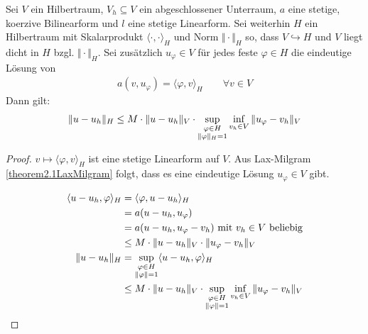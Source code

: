\begin{theorem}\enter
Sei $V$ ein Hilbertraum, $V_h\subseteq V$ ein abgeschlossener Unterraum, $a$ eine stetige, koerzive Bilinearform und $l$ eine stetige Linearform. Sei weiterhin $H$ ein Hilbertraum mit Skalarprodukt $\langle\cdot,\cdot\rangle_H$ und Norm $\Vert\cdot\Vert_H$ so, dass $V\hookrightarrow H$ und $V$ liegt dicht in $H$ bzgl. $\Vert\cdot\Vert_H$. Sei zusätzlich $u_\varphi\in V$ für jedes feste $\varphi\in H$ die eindeutige Lösung von
\begin{align}\label{Dtheorem2.3}\tag{D}
a(v,u_\varphi)=\langle\varphi,v\rangle_H\qquad\forall v\in V
\end{align}
Dann gilt:
\begin{align*}
\Vert u-u_h\Vert_H\leq M\cdot\Vert u-u_h\Vert_V\cdot\sup\limits_{\begin{subarray}{c}\varphi\in H\\\Vert\varphi\Vert_H=1\end{subarray}}\inf\limits_{v_h\in V}\Vert u_\varphi-v_h\Vert_V
\end{align*}
\end{theorem}

\begin{proof}
$v\mapsto\langle\varphi,v\rangle_H$ ist eine stetige Linearform auf $V$. Aus Lax-Milgram \ref{theorem2.1LaxMilgram} folgt, dass es eine eindeutige Lösung $u_\varphi\in V$ gibt.
 
\begin{align*}
\langle u-u_h,\varphi\rangle_H
&=\langle\varphi,u-u_h\rangle_H\\
&=a(u-u_h,u_\varphi)\\
&=a(u-u_h,u_\varphi-v_h)\mit v_h\in V\text{ beliebig}\\
&\leq M\cdot\Vert u-u_h\Vert_V\cdot\Vert u_\varphi-v_h\Vert_V\\
\Vert u-u_h\Vert_H
&=\sup\limits_{\begin{subarray}{c}\varphi\in H\\\Vert\varphi\Vert=1\end{subarray}}\langle u-u_h,\varphi\rangle_H\\
&\leq M\cdot\Vert u-u_h\Vert_V\cdot\sup\limits_{\begin{subarray}{c}\varphi\in H\\\Vert\varphi\Vert=1\end{subarray}}\inf\limits_{v_h\in V}\Vert u_\varphi-v_h\Vert_V
\end{align*}
\end{proof}

